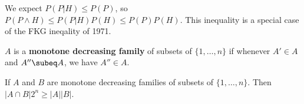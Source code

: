 We expect $P(P|H)\le P(P)$, so $P(P\wedge H)\le P(P|H)P(H)\le P(P)P(H)$.
This inequality is a special case of the FKG ineqality of 1971. %

\begin{df}
$A$ is a \textbf{monotone decreasing family} of subsets of $\{1,\ldots, n\}$ if whenever $A'\in A$ and $A''\subeq A$, we have $A''\in A$.
\end{df}
\begin{thm}
If $A$ and $B$ are monotone decreasing families of subsets of $\{1,\ldots, n\}$. Then $|A\cap B|2^n\ge |A||B|$.
\end{thm}
